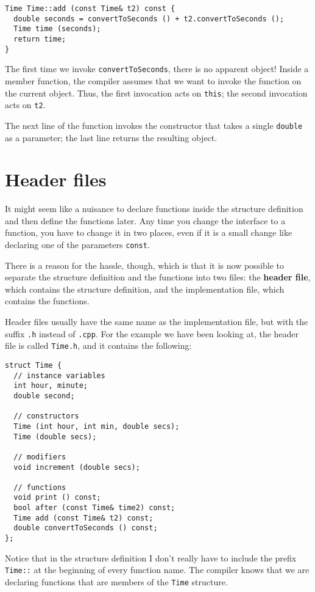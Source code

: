 \begin{verbatim}
Time Time::add (const Time& t2) const {
  double seconds = convertToSeconds () + t2.convertToSeconds ();
  Time time (seconds);
  return time;
}
\end{verbatim}
%
The first time we invoke {\tt convertToSeconds},
there is no apparent object!  Inside a member function, the compiler
assumes that we want to invoke the function on the current object.
Thus, the first invocation acts on {\tt this}; the second
invocation acts on {\tt t2}.

The next line of the function invokes the constructor that
takes a single {\tt double} as a parameter; the last line returns
the resulting object.

\section {Header files}

It might seem like a nuisance to declare functions inside
the structure definition and then define the functions later.
Any time you change the interface to a function, you have
to change it in two places, even if it is a small change
like declaring one of the parameters {\tt const}.

There is a reason for the hassle, though, which is that it
is now possible to separate the structure definition and the
functions into two files: the {\bf header file},
which contains the structure definition, and the implementation
file, which contains the functions.

Header files usually have the same name as the implementation
file, but with the suffix {\tt .h} instead of {\tt .cpp}.  For
the example we have been looking at, the header file is called
{\tt Time.h}, and it contains the following:

\begin{verbatim}
struct Time {
  // instance variables
  int hour, minute;
  double second;

  // constructors
  Time (int hour, int min, double secs);
  Time (double secs);

  // modifiers
  void increment (double secs);

  // functions
  void print () const;
  bool after (const Time& time2) const;
  Time add (const Time& t2) const;
  double convertToSeconds () const;
};
\end{verbatim}
%
Notice that in the structure definition I don't really have
to include the prefix {\tt Time::} at the beginning of every
function name.  The compiler knows that we are declaring functions
that are members of the {\tt Time} structure.

